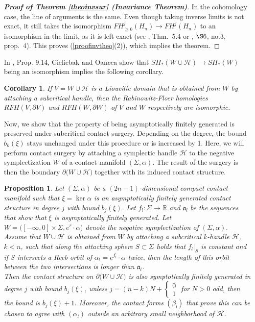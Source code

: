 \documentclass[a4paper,12pt,bibliography=totocnumbered,titlepage=false,abstracton,bookmarksnumbered=true]{scrartcl}
\newtheorem{prop}[defn]{Proposition}
\newtheorem{cor}[defn]{Corollary}
\theoremstyle{definition}
\begin{document}
\begin{proof}[\textnormal{\textbf{Proof of Theorem \ref{theoinvsur} (Invariance Theorem)}}]
In the cohomology case, the line of arguments is the same. Even though taking inverse limits is not exact, it still takes the isomorphism $FH^j_{\geq 0}(H_n)\rightarrow FH^j(H_n)$ to an isomorphism in the limit, as it is left exact (see \cite{eilenberg}, Thm.\ 5.4 or \cite{bourbaki2}, $\S6$, no.3, prop.\ 4). This proves (\ref{proofinvtheo}(2)), which implies the theorem.
\end{proof}
In \cite{CieOan}, Prop. 9.14, Cieliebak and Oancea show that $SH_\ast(W{\cup}\mathcal{H})\rightarrow SH_\ast(W)$ being an isomorphism implies the following corollary.
\begin{cor}
 If $V=W{\cup}\mathcal{H}$ is a Liouville domain that is obtained from $W$ by attaching a subcritical handle, then the Rabinowitz-Floer homologies $RFH(V,\partial V)$ and $RFH(W,\partial W)$ of $V$ and $W$ respectively are isomorphic.
\end{cor}
Now, we show that the property of being asymptotically finitely generated is preserved under subcritical contact surgery. Depending on the degree, the bound $b_k(\xi)$ stays unchanged under this procedure or is increased by 1. Here, we will perform contact surgery by attaching a symplectic handle $\mathcal{H}$ to the negative symplectization $W$ of a contact manifold $(\Sigma,\alpha)$. The result of the surgery is then the boundary $\partial\big(W{\cup}\mathcal{H}\big)$ together with its induced contact structure.
\begin{prop}\label{propcofinalHamilt}
 Let $(\Sigma,\alpha)$ be a $(2n{-}1)$-dimensional compact contact manifold such that $\xi=\ker \alpha$ is an asymptotically finitely generated contact structure in degree $j$ with bound $b_j(\xi)$. Let $f_l:\Sigma\rightarrow\mathbb{R}$ and $\mathfrak{a}_l$ be the sequences that show that $\xi$ is asymptotically finitely generated. Let $W=\big([-\infty,0]{\times}\Sigma,e^r{\cdot}\alpha\big)$ denote the negative symplectization of $(\Sigma,\alpha)$.\\
 Assume that $W{\cup}\mathcal{H}$ is obtained from $W$ by attaching a subcritical $k$-handle $\mathcal{H}$, $k<n$, such that along the attaching sphere $S\subset\Sigma$ holds that $f_l|_S$ is constant and if $S$ intersects a Reeb orbit of $\alpha_l=e^{f_l}{\cdot}\alpha$ twice, then the length of this orbit between the two intersections is longer than $\mathfrak{a}_l$.\\
 Then the contact structure on $\partial\big(W{\cup}\mathcal{H}\big)$ is also symptotically finitely generated in degree $j$ with bound $b_j(\xi)$, unless $j=(n{-}k)N+\left\lbrace\begin{smallmatrix}0\\1\end{smallmatrix}\right.$ for $N>0$ odd, then the bound is $b_j(\xi)+1$. Moreover, the contact forms $(\beta_l)$ that prove this can be chosen to agree with $(\alpha_l)$ outside an arbitrary small neighborhood of $\mathcal{H}$.
\end{prop}
\end{document}
